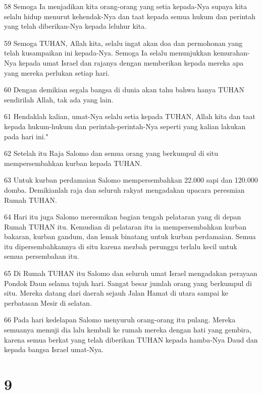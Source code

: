 \par 58 Semoga Ia menjadikan kita orang-orang yang setia kepada-Nya supaya kita selalu hidup menurut kehendak-Nya dan taat kepada semua hukum dan perintah yang telah diberikan-Nya kepada leluhur kita.
\par 59 Semoga TUHAN, Allah kita, selalu ingat akan doa dan permohonan yang telah kusampaikan ini kepada-Nya. Semoga Ia selalu menunjukkan kemurahan-Nya kepada umat Israel dan rajanya dengan memberikan kepada mereka apa yang mereka perlukan setiap hari.
\par 60 Dengan demikian segala bangsa di dunia akan tahu bahwa hanya TUHAN sendirilah Allah, tak ada yang lain.
\par 61 Hendaklah kalian, umat-Nya selalu setia kepada TUHAN, Allah kita dan taat kepada hukum-hukum dan perintah-perintah-Nya seperti yang kalian lakukan pada hari ini."
\par 62 Setelah itu Raja Salomo dan semua orang yang berkumpul di situ mempersembahkan kurban kepada TUHAN.
\par 63 Untuk kurban perdamaian Salomo mempersembahkan 22.000 sapi dan 120.000 domba. Demikianlah raja dan seluruh rakyat mengadakan upacara peresmian Rumah TUHAN.
\par 64 Hari itu juga Salomo meresmikan bagian tengah pelataran yang di depan Rumah TUHAN itu. Kemudian di pelataran itu ia mempersembahkan kurban bakaran, kurban gandum, dan lemak binatang untuk kurban perdamaian. Semua itu dipersembahkannya di situ karena mezbah perunggu terlalu kecil untuk semua persembahan itu.
\par 65 Di Rumah TUHAN itu Salomo dan seluruh umat Israel mengadakan perayaan Pondok Daun selama tujuh hari. Sangat besar jumlah orang yang berkumpul di situ. Mereka datang dari daerah sejauh Jalan Hamat di utara sampai ke perbatasan Mesir di selatan.
\par 66 Pada hari kedelapan Salomo menyuruh orang-orang itu pulang. Mereka semuanya memuji dia lalu kembali ke rumah mereka dengan hati yang gembira, karena semua berkat yang telah diberikan TUHAN kepada hamba-Nya Daud dan kepada bangsa Israel umat-Nya.

\chapter{9}


